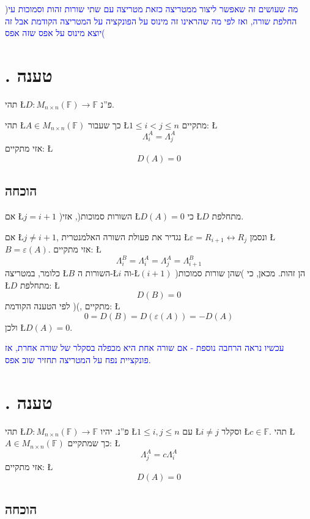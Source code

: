 \documentclass[english,hebrew]{article}
\begin{document}
\textcolor{blue}{)מה שעושים זה שאפשר ליצור ממטריצה כזאת מטריצה עם
שתי שורות זהות וסמוכות ע\textquotedbl י החלפת שורה, ואז לפי מה שהראינו
זה מינוס על הפונקציה על המטריצה הקודמת אבל זה יוצא מינוס על אפס שזה
אפס(}

\section{{\endL}. טענה}

תהי \L{$D\colon M_{n\times n}(\mathbb{F})\to\mathbb{F}$} פ\textquotedblright נ.

תהי \L{$A\in M_{n\times n}(\mathbb{F})$} כך שעבור \L{$1\le i<j\le n$}
מתקיים: \L{%
\[
\Lambda_{i}^{A}=\Lambda_{j}^{A}
\]
}%
אזי מתקיים: \L{%
\[
D(A)=0
\]
}%

\subsection{הוכחה}

אם \L{$j=i+1$} )השורות סמוכות(, אזי \L{$D(A)=0$} כי \L{$D$} מתחלפת.

אם \L{$j\neq i+1$}, נגדיר את פעולת השורה האלמנטרית \L{$\varepsilon=R_{i+1}\leftrightarrow R_{j}$}
ונסמן \L{$B=\varepsilon(A)$}. אזי מתקיים: \L{%
\[
\Lambda_{i}^{B}=\Lambda_{i}^{A}=\Lambda_{j}^{A}=\Lambda_{i+1}^{B}
\]
}%
כלומר, במטריצה \L{$B$} השורות ה-\L{$i$} וה-\L{$(i+1)$} )שהן שורות
סמוכות( הן זהות. מכאן, כי \L{$D$} מתחלפת: \L{%
\[
D(B)=0
\]
}%
לפי הטענה הקודמת ){\endL}(, מתקיים: \L{%
\[
0=D(B)=D(\varepsilon(A))=-D(A)
\]
}%
ולכן \L{$D(A)=0$}.

\medskip{}

\textcolor{blue}{עכשיו נראה הרחבה נוספת - אם שורה אחת היא מכפלה בסקלר
של שורה אחרת, אז פונקציית נפח על המטריצה תחזיר שוב אפס.}

\section{{\endL}. טענה}

תהי \L{$D\colon M_{n\times n}(\mathbb{F})\to\mathbb{F}$} פ\textquotedblright נ.
יהיו \L{$1\le i,j\le n$} עם \L{$i\neq j$} וסקלר \L{$c\in\mathbb{F}$}.
תהי \L{$A\in M_{n\times n}(\mathbb{F})$} כך שמתקיים: \L{%
\[
\Lambda_{j}^{A}=c\Lambda_{i}^{A}
\]
}%
אזי מתקיים: \L{%
\[
D(A)=0
\]
}%

\subsection{הוכחה}
\end{document}
